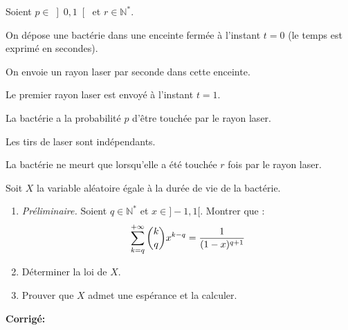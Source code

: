 \documentclass[a4paper,twoside,french,11pt]{VcCours}
\newcommand{\corr}{\textbf{Corrigé:}}
\begin{document}
\begin{Exercice}{} Soient $p\in \left] 0,1\right[$ et $r\in\mathbb{N}^*$.

On dépose une bactérie dans une enceinte fermée à l'instant $t=0$ (le temps est exprimé en secondes).

On envoie un rayon laser par seconde dans cette enceinte.

Le premier rayon laser est envoyé à l'instant $t=1$.

La bactérie a la probabilité $p$ d'être touchée par le rayon laser.

Les tirs de laser sont indépendants.

La bactérie ne meurt que lorsqu'elle a été touchée $r$ fois par le rayon laser.

Soit $X$ la variable aléatoire égale à la durée de vie de la bactérie.
\begin{enumerate}
\item \textit{Préliminaire.} Soient $q \in \mathbb{N}^*$ et $x \in ]-1,1[$. Montrer que : 
$$ \sum\limits_{k=q}^{+\infty}\dbinom{k}{q}x^{k-q}=\dfrac{1}{(1-x)^{q+1}}$$
\item
Déterminer la loi de $X$.
\item
Prouver que $X$ admet une espérance et la calculer.
\end{enumerate}
\end{Exercice}

\corr
\end{document}
